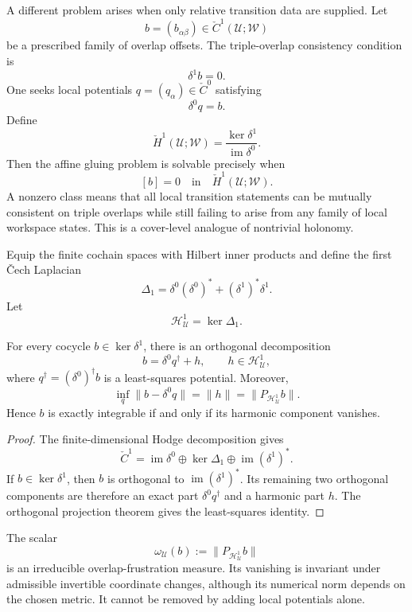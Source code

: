 
A different problem arises when only relative transition data are supplied.
Let
\[
b=(b_{\alpha\beta})\in\check C^1(\mathcal U;\mathscr W)
\]
be a prescribed family of overlap offsets. The triple-overlap consistency
condition is
\[
\delta^1b=0.
\]
One seeks local potentials \(q=(q_\alpha)\in\check C^0\) satisfying
\[
\delta^0q=b.
\]
Define
\[
\boxed{
\check H^1(\mathcal U;\mathscr W)
=
\frac{\ker\delta^1}{\operatorname{im}\delta^0}.
}
\]
Then the affine gluing problem is solvable precisely when
\[
\boxed{[b]=0\quad\text{in}\quad\check H^1(\mathcal U;\mathscr W).}
\]
A nonzero class means that all local transition statements can be mutually
consistent on triple overlaps while still failing to arise from any family of
local workspace states. This is a cover-level analogue of nontrivial holonomy.


Equip the finite cochain spaces with Hilbert inner products and define the
first \v{C}ech Laplacian
\[
\boxed{
\Delta_1
=
\delta^0(\delta^0)^*
+
(\delta^1)^*\delta^1.
}
\]
Let
\[
\mathcal H^1_{\mathcal U}=\ker\Delta_1.
\]

\begin{proposition}\label{prop:harmonic-gluing-obstruction}
For every cocycle \(b\in\ker\delta^1\), there is an orthogonal decomposition
\[
\boxed{
b=\delta^0q^\dagger+h,
\qquad
h\in\mathcal H^1_{\mathcal U},
}
\]
where \(q^\dagger=(\delta^0)^\dagger b\) is a least-squares potential. Moreover,
\[
\boxed{
\inf_q\|b-\delta^0q\|
=
\|h\|
=
\|P_{\mathcal H^1_{\mathcal U}}b\|.
}
\]
Hence \(b\) is exactly integrable if and only if its harmonic component
vanishes.
\end{proposition}

\begin{proof}
The finite-dimensional Hodge decomposition gives
\[
\check C^1
=
\operatorname{im}\delta^0
\oplus
\ker\Delta_1
\oplus
\operatorname{im}(\delta^1)^*.
\]
If \(b\in\ker\delta^1\), then \(b\) is orthogonal to
\(\operatorname{im}(\delta^1)^*\). Its remaining two orthogonal components are
therefore an exact part \(\delta^0q^\dagger\) and a harmonic part \(h\). The
orthogonal projection theorem gives the least-squares identity.
\end{proof}

The scalar
\[
\omega_{\mathcal U}(b)
:=
\|P_{\mathcal H^1_{\mathcal U}}b\|
\]
is an irreducible overlap-frustration measure. Its vanishing is
invariant under admissible invertible coordinate changes, although its numerical
norm depends on the chosen metric. It cannot be removed by adding local
potentials alone.

